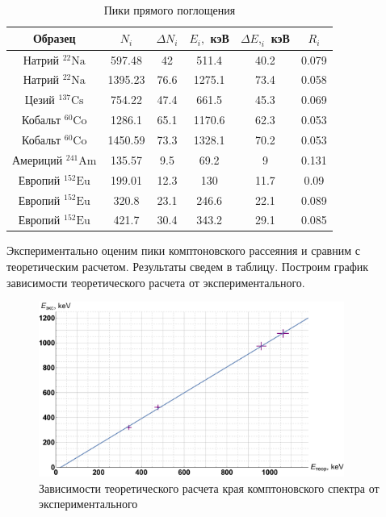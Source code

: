\documentclass[12pt,a4paper]{article}
\begin{document}
\begin{table}[H]
	\caption{Пики прямого поглощения}
	\begin{center}
		\begin{tabular}{|c|c|c|c|c|c|}
			\hline 
			Образец                         & $N_i $  & $ \Delta N_i $ & $ E_i, $ кэВ & $ \Delta E,_i $ кэВ & $ R_i $ \\ 
			\hline 
			Натрий $ \mathrm{^{22}Na} $      & 597.48  & 42             & 511.4           & 40.2                   & 0.079   \\
			Натрий $ \mathrm{^{22}Na} $      & 1395.23 & 76.6           & 1275.1          & 73.4                   & 0.058   \\
			Цезий $ \mathrm{^{137}Cs} $       & 754.22  & 47.4           & 661.5           & 45.3                   & 0.069   \\
			Кобальт $ \mathrm{^{60}Co} $    & 1286.1  & 65.1           & 1170.6          & 62.3                   & 0.053   \\
			Кобальт $ \mathrm{^{60}Co} $    & 1450.59 & 73.3           & 1328.1          & 70.2                   & 0.053   \\
			Америций $ \mathrm{^{241}Am} $ & 135.57  & 9.5            & 69.2            & 9                      & 0.131   \\
			Европий	 $ \mathrm{^{152}Eu} $  & 199.01  & 12.3           & 130             & 11.7                   & 0.09    \\
			Европий	 $ \mathrm{^{152}Eu} $  & 320.8   & 23.1           & 246.6           & 22.1                   & 0.089   \\
			Европий	 $ \mathrm{^{152}Eu} $  & 421.7   & 30.4           & 343.2           & 29.1                   & 0.085   \\
							
			
			\hline 
		\end{tabular} 
	\end{center}
	\label{res}
\end{table}

Экспериментально оценим пики комптоновского рассеяния и сравним с теоретическим расчетом. Результаты сведем в таблицу. Построим график зависимости теоретического расчета от экспериментального. 
	
\begin{figure}[H]
	\label{graf_com}
	\includegraphics[width=10cm]{src/comp.pdf}
	\caption{Зависимости теоретического расчета края комптоновского спектра от экспериментального}
\end{figure} 
	
\end{document}
